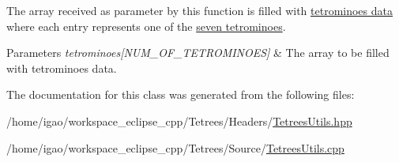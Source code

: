 The array received as parameter by this function is filled with \hyperlink{structpiece__t}{tetrominoes\textquotesingle{} data} where each entry represents one of the \hyperlink{TetreesDefs_8hpp_acd279a62a49ecee418dd808ac39a1795}{seven tetrominoes}. 
\begin{DoxyParams}{Parameters}
{\em tetrominoes\mbox{[}\+N\+U\+M\+\_\+\+O\+F\+\_\+\+T\+E\+T\+R\+O\+M\+I\+N\+O\+E\+S\mbox{]}} & The array to be filled with tetrominoes\textquotesingle{} data. \\
\hline
\end{DoxyParams}


The documentation for this class was generated from the following files\+:\begin{DoxyCompactItemize}
\item 
/home/igao/workspace\+\_\+eclipse\+\_\+cpp/\+Tetrees/\+Headers/\hyperlink{TetreesUtils_8hpp}{Tetrees\+Utils.\+hpp}\item 
/home/igao/workspace\+\_\+eclipse\+\_\+cpp/\+Tetrees/\+Source/\hyperlink{TetreesUtils_8cpp}{Tetrees\+Utils.\+cpp}\end{DoxyCompactItemize}
